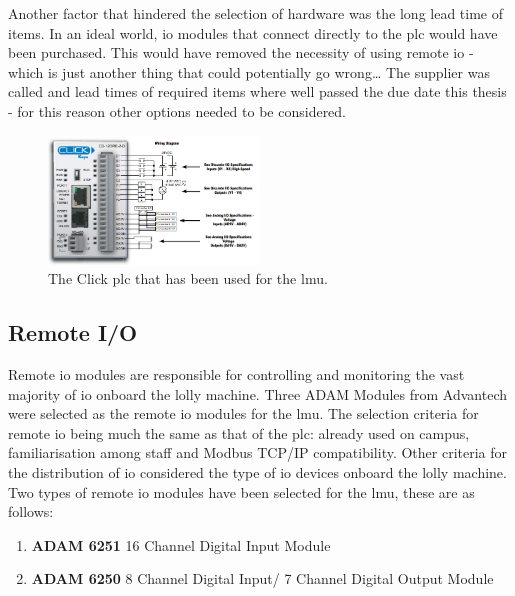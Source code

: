         Another factor that hindered the selection of hardware was the long lead time of items. In an ideal world, \acrshort{io} modules that connect directly to the \acrshort{plc} would have been purchased. This would have removed the necessity of using remote \acrshort{io} - which is just another thing that could potentially go wrong… The supplier was called and lead times of required items where well passed the due date this thesis - for this reason other options needed to be considered.
    
        \begin{figure}[H]
            \centering
            \includegraphics[width = 0.5\textwidth]{2_images/clickPlc}
            \caption{The Click \acrshort{plc} that has been used for the \acrshort{lmu}\cite{clickPlcData}.}
            \label{fig:plc}
        \end{figure} 
    
    \subsection{Remote I/O}
        Remote \acrshort{io} modules are responsible for controlling and monitoring the vast majority of \acrshort{io} onboard the lolly machine.
        Three ADAM Modules from Advantech were selected as the remote \acrshort{io} modules for the \acrshort{lmu}. The selection criteria for remote \acrshort{io} being much the same as that of the \acrshort{plc}: already used on campus, familiarisation among staff and Modbus TCP/IP compatibility. Other criteria for the distribution of \acrshort{io}  considered the type of \acrfull{io} devices onboard the lolly machine. Two types of remote \acrshort{io} modules have been selected for the \acrshort{lmu}, these are as follows:
        \begin{enumerate}
            \item \textbf{ADAM 6251} 16 Channel Digital Input Module
            \item \textbf{ADAM 6250} 8 Channel Digital Input/ 7 Channel Digital Output Module
        \end{enumerate}
    
